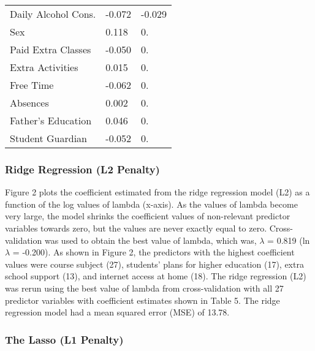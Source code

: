 \documentclass[sigconf]{acmart}
\begin{document}
\begin{table}
\begin{tabular}{lll}
    Daily Alcohol Cons. &   -0.072      &   -0.029   \\ 
    Sex                 &    0.118      &    0.   \\
    Paid Extra Classes  &   -0.050      &    0.   \\      
    Extra Activities    &    0.015      &    0.   \\    
    Free Time           &   -0.062      &    0.   \\    
    Absences            &    0.002      &    0.   \\
    Father's Education  &    0.046      &    0.   \\         
    Student Guardian    &   -0.052      &    0.   \\    

    \bottomrule
  \end{tabular}
\end{table}


\subsubsection{Ridge Regression (L2 Penalty)}

Figure 2 plots the coefficient estimated from the ridge regression model (L2) 
as a function of the log values of lambda (x-axis). As the values of lambda 
become very large, the model shrinks the coefficient values of non-relevant 
predictor variables towards zero, but the values are never exactly equal to 
zero. Cross-validation was used to obtain the best value of lambda, which 
was, $\lambda$ = 0.819 (ln$\lambda$  = -0.200). As shown in Figure 2, the 
predictors with the highest coefficient values were course subject (27), 
students' plans for higher education (17), extra school support (13), and 
internet access at home (18). The ridge regression (L2) was rerun using the
best value of lambda from cross-validation with all 27 predictor variables 
with coefficient estimates shown in Table 5. The ridge regression model had 
a mean squared error (MSE) of 13.78. 


\subsubsection{The Lasso (L1 Penalty)}
\end{document}
